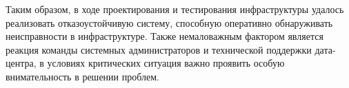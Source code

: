 Таким образом, в ходе проектирования и тестирования инфраструктуры удалось реализовать отказоустойчивую систему, способную оперативно обнаруживать неисправности в инфраструктуре.
Также немаловажным фактором является реакция команды системных администраторов и технической поддержки дата-центра, в условиях критических ситуация важно проявить особую внимательность в решении проблем.

\clearpage